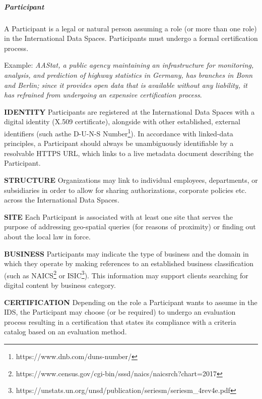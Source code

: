 \subparagraph*{Participant}
A Participant is a legal or natural person assuming a role (or more than one role) in the International Data Spaces. Participants must undergo a formal certification process.  

Example: \textit{AAStat, a public agency maintaining an infrastructure for monitoring, analysis, and prediction of highway statistics in Germany, has branches in Bonn and Berlin; since it provides open data that is available without any liability, it has refrained from undergoing an expensive certification process}.

\textbf{IDENTITY} Participants are registered at the International Data Spaces with a digital identity (X.509 certificate), alongside with other established, external identifiers (such asthe D-U-N-S Number\footnote{https://www.dnb.com/duns-number/ }). In accordance with linked-data principles, a Participant should always be unambiguously identifiable by a resolvable HTTPS URL, which links to a live metadata document describing the Participant.

\textbf{STRUCTURE} Organizations may link to individual employees, departments, or subsidiaries in order to allow for sharing authorizations, corporate policies etc. across the International Data Spaces. 

\textbf{SITE} Each Participant is associated with at least one site that serves the purpose of addressing geo-spatial queries (for reasons of proximity) or finding out about the local law in force. 

\textbf{BUSINESS} Participants may indicate the type of business and the domain in which they operate by making references to an established business classification (such as NAICS\footnote{https://www.census.gov/cgi-bin/sssd/naics/naicsrch?chart=2017 } or ISIC\footnote{https://unstats.un.org/unsd/publication/seriesm/seriesm\_4rev4e.pdf }). This information may support clients searching for digital content by business category. 

\textbf{CERTIFICATION} Depending on the role a Participant wants to assume in the IDS, the Participant may choose (or be required) to undergo an evaluation process resulting in a certification that states its compliance with a criteria catalog based on an evaluation method.





